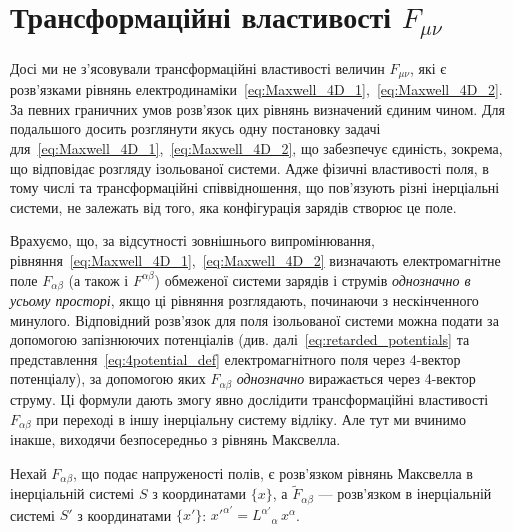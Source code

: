 \section{Трансформаційні властивості \texorpdfstring{$F_{\mu\nu}$}{Fmunu}}

Досі ми не з'ясовували трансформаційні властивості величин $F_{\mu\nu}$, які є розв'язками рівнянь електродинаміки~\eqref{eq:Maxwell_4D_1},~\eqref{eq:Maxwell_4D_2}. За певних граничних умов розв'язок цих рівнянь визначений єдиним чином. Для подальшого досить розглянути якусь одну постановку задачі для~\eqref{eq:Maxwell_4D_1},~\eqref{eq:Maxwell_4D_2}, що забезпечує єдиність, зокрема, що відповідає розгляду ізольованої системи. Адже фізичні властивості поля, в тому числі та трансформаційні співвідношення, що пов'язують різні інерціальні системи, не залежать від того, яка конфігурація зарядів створює це поле.

Врахуємо, що, за відсутності зовнішнього випромінювання, рівняння~\eqref{eq:Maxwell_4D_1},~\eqref{eq:Maxwell_4D_2} визначають електромагнітне поле $F_{\alpha\beta}$ (а також і $F^{\alpha\beta}$) обмеженої системи зарядів і струмів \emph{однозначно в усьому просторі}, якщо ці рівняння розглядають, починаючи з нескінченного минулого. Відповідний розв'язок для поля ізольованої системи можна подати за допомогою запізнюючих потенціалів (див. далі~\eqref{eq:retarded_potentials} та представлення~\eqref{eq:4potential_def} електромагнітного поля через 4-вектор потенціалу), за допомогою яких $F_{\alpha\beta}$ \emph{однозначно} виражається через 4-вектор струму. Ці формули дають змогу явно дослідити трансформаційні властивості $F_{\alpha\beta}$ при переході в іншу інерціальну систему відліку. Але тут ми вчинимо інакше, виходячи безпосередньо з рівнянь Максвелла.

Нехай $F_{\alpha\beta}$, що подає напруженості полів, є розв'язком рівнянь Максвелла в інерціальній системі $S$ з координатами $\{x\}$, а $\tilde{F}_{\alpha\beta}$ --- розв'язком в інерціальній системі $S'$ з координатами $\{x'\}$: $x'^{\alpha'} = L^{\alpha'}{}_{\alpha}\,x^{\alpha}$.

